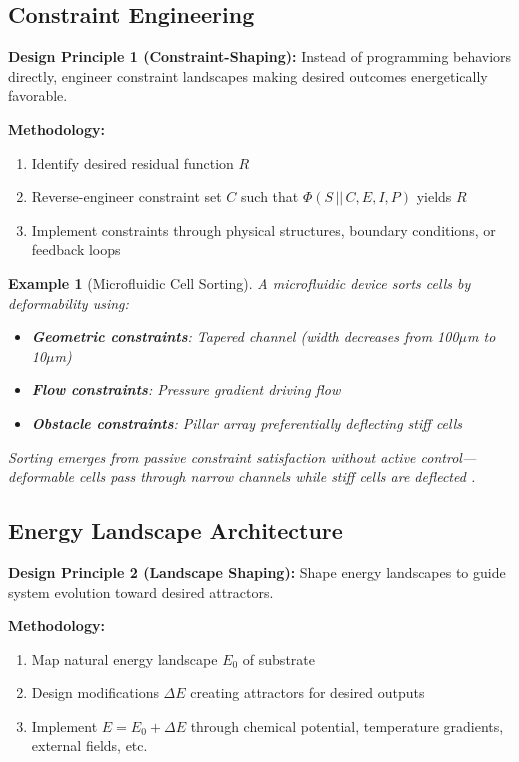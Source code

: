 \documentclass[11pt]{article}
\newtheorem{example}{Example}
\begin{document}
\subsection{Constraint Engineering}

\textbf{Design Principle 1 (Constraint-Shaping):} Instead of programming behaviors directly, engineer constraint landscapes making desired outcomes energetically favorable.

\textbf{Methodology:}
\begin{enumerate}
\item Identify desired residual function $R$
\item Reverse-engineer constraint set $C$ such that $\Phi(S \,||\, C, E, I, P)$ yields $R$
\item Implement constraints through physical structures, boundary conditions, or feedback loops
\end{enumerate}

\begin{example}[Microfluidic Cell Sorting]
A microfluidic device sorts cells by deformability using:
\begin{itemize}
\item \textbf{Geometric constraints}: Tapered channel (width decreases from 100$\mu$m to 10$\mu$m)
\item \textbf{Flow constraints}: Pressure gradient driving flow
\item \textbf{Obstacle constraints}: Pillar array preferentially deflecting stiff cells
\end{itemize}
Sorting emerges from passive constraint satisfaction without active control—deformable cells pass through narrow channels while stiff cells are deflected \citep{hur2011deformability}.
\end{example}

\subsection{Energy Landscape Architecture}

\textbf{Design Principle 2 (Landscape Shaping):} Shape energy landscapes to guide system evolution toward desired attractors.

\textbf{Methodology:}
\begin{enumerate}
\item Map natural energy landscape $E_0$ of substrate
\item Design modifications $\Delta E$ creating attractors for desired outputs
\item Implement $E = E_0 + \Delta E$ through chemical potential, temperature gradients, external fields, etc.
\end{enumerate}
\end{document}

